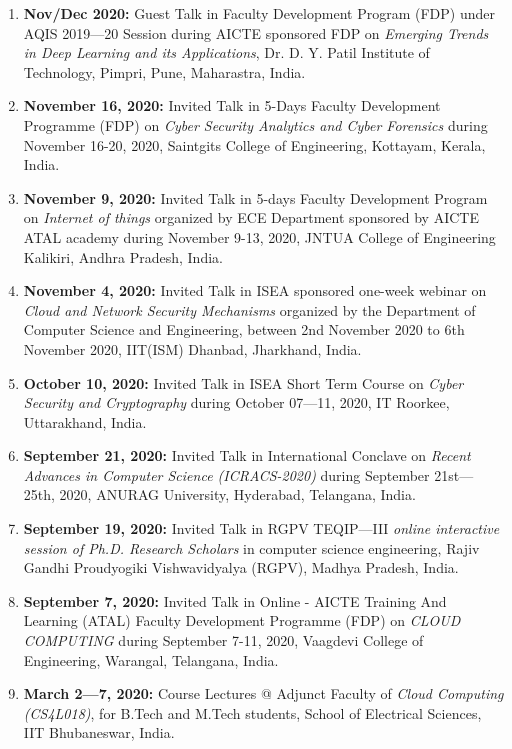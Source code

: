\begin{enumerate}
\item
\textbf{Nov/Dec 2020:} Guest Talk in Faculty Development Program (FDP) under AQIS 2019—20 Session during AICTE sponsored FDP on \textit{Emerging Trends in Deep Learning and its Applications}, Dr. D. Y. Patil Institute of Technology, Pimpri, Pune, Maharastra, India.

\item
\textbf{November 16, 2020:} Invited Talk in 5-Days Faculty Development Programme (FDP) on \textit{Cyber Security Analytics and Cyber Forensics} during November 16-20, 2020, Saintgits College of Engineering, Kottayam, Kerala, India.

\item
\textbf{November 9, 2020:} Invited Talk in 5-days Faculty Development Program on \textit{Internet of things}  organized by ECE Department  sponsored by AICTE ATAL academy during November 9-13, 2020, JNTUA College of Engineering Kalikiri, Andhra Pradesh, India.

\item
\textbf{November 4, 2020:} Invited Talk in ISEA sponsored one-week webinar on \textit{Cloud and Network Security Mechanisms} organized by the Department of Computer Science and Engineering, between 2nd November 2020 to 6th November 2020, IIT(ISM) Dhanbad, Jharkhand, India.

\item
\textbf{October 10, 2020:} Invited Talk in ISEA Short Term Course on \textit{Cyber Security and Cryptography} during October 07—11, 2020, IT Roorkee, Uttarakhand, India.

\item
\textbf{September 21, 2020:} Invited Talk in International Conclave on \textit{Recent Advances in Computer Science (ICRACS-2020)} during September 21st—25th, 2020, ANURAG University, Hyderabad, Telangana, India.

\item
\textbf{September 19, 2020:} Invited Talk in RGPV TEQIP—III \textit{online interactive session of Ph.D. Research Scholars} in computer science engineering, Rajiv Gandhi Proudyogiki Vishwavidyalya (RGPV), Madhya Pradesh, India.

\item
\textbf{September 7, 2020:} Invited Talk in Online - AICTE Training And Learning (ATAL) Faculty Development Programme (FDP) on \textit{CLOUD COMPUTING}   during September 7-11,  2020, Vaagdevi College of Engineering, Warangal, Telangana, India.

\item
\textbf{March 2—7, 2020:} Course Lectures @ Adjunct Faculty of \textit{Cloud Computing (CS4L018)}, for B.Tech and M.Tech students, School of Electrical Sciences, IIT Bhubaneswar, India.


\end{enumerate}
